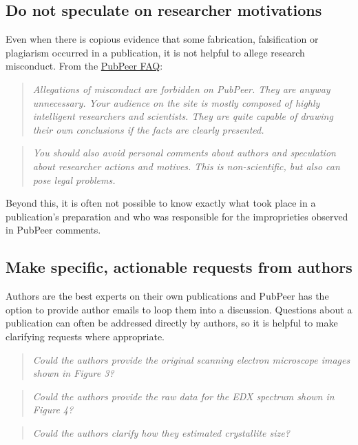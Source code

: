\documentclass[letterpaper, 12pt]{article}
\begin{document}
\subsection*{Do not speculate on researcher motivations}

Even when there is copious evidence that some fabrication, falsification or plagiarism occurred in a publication, it is not helpful to allege research misconduct. From the \href{https://pubpeer.com/static/faq#4}{PubPeer FAQ}:

\begin{quote}
    \textit{Allegations of misconduct are forbidden on PubPeer. They are anyway unnecessary. Your audience on the site is mostly composed of highly intelligent researchers and scientists. They are quite capable of drawing their own conclusions if the facts are clearly presented.}
\end{quote}

\begin{quote}
    \textit{You should also avoid personal comments about authors and speculation about researcher actions and motives. This is non-scientific, but also can pose legal problems.}
\end{quote}

Beyond this, it is often not possible to know exactly what took place in a publication's preparation and who was responsible for the improprieties observed in PubPeer comments.

\subsection*{Make specific, actionable requests from authors}

Authors are the best experts on their own publications and PubPeer has the option to provide author emails to loop them into a discussion. Questions about a publication can often be addressed directly by authors, so it is helpful to make clarifying requests where appropriate.

\begin{quote}
    \textit{Could the authors provide the original scanning electron microscope images shown in Figure 3?}
\end{quote}

\begin{quote}
    \textit{Could the authors provide the raw data for the EDX spectrum shown in Figure 4?}
\end{quote}

\begin{quote}
    \textit{Could the authors clarify how they estimated crystallite size?}
\end{quote}
\end{document}
